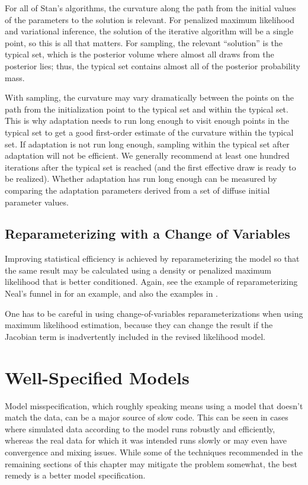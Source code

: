 For all of Stan's algorithms, the curvature along the path from the
initial values of the parameters to the solution is relevant.  For
penalized maximum likelihood and variational inference, the solution
of the iterative algorithm will be a single point, so this is all that
matters.  For sampling, the relevant ``solution'' is the typical set,
which is the posterior volume where almost all draws from the
posterior lies;  thus, the typical set contains almost all of the
posterior probability mass.

With sampling, the curvature may vary dramatically between the points
on the path from the initialization point to the typical set and
within the typical set.  This is why adaptation needs to run long
enough to visit enough points in the typical set to get a good
first-order estimate of the curvature within the typical set.  If
adaptation is not run long enough, sampling within the typical set
after adaptation will not be efficient.  We generally recommend at
least one hundred iterations after the typical set is reached (and the
first effective draw is ready to be realized).  Whether adaptation has
run long enough can be measured by comparing the adaptation parameters
derived from a set of diffuse initial parameter values.


\subsection{Reparameterizing with a Change of Variables}

Improving statistical efficiency is achieved by reparameterizing the
model so that the same result may be calculated using a density or
penalized maximum likelihood that is better conditioned.  Again, see
the example of reparameterizing Neal's funnel in 
for an example, and also the examples in
.

One has to be careful in using change-of-variables reparameterizations
when using maximum likelihood estimation, because they can change the
result if the Jacobian term is inadvertently included in the revised
likelihood model.


\section{Well-Specified Models}

Model misspecification, which roughly speaking means using a model
that doesn't match the data, can be a major source of slow code.  This
can be seen in cases where simulated data according to the model runs
robustly and efficiently, whereas the real data for which it was
intended runs slowly or may even have convergence and mixing issues.
While some of the techniques recommended in the remaining sections of
this chapter may mitigate the problem somewhat, the best remedy is a
better model specification.

